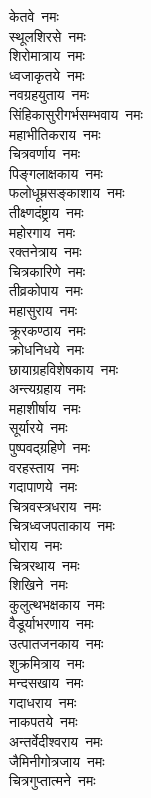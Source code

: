 \begin{flushleft}
\begin{multicols}{2}
केतवे~नमः\\
स्थूलशिरसे~नमः\\
शिरोमात्राय~नमः\\
ध्वजाकृतये~नमः\\
नवग्रहयुताय~नमः\\
सिंहिकासुरीगर्भसम्भवाय~नमः\\
महाभीतिकराय~नमः\\
चित्रवर्णाय~नमः\\
पिङ्गलाक्षकाय~नमः\\
फलोधूम्रसङ्काशाय~नमः\hfill{}\\
तीक्ष्णदंष्ट्राय~नमः\\
महोरगाय~नमः\\
रक्तनेत्राय~नमः\\
चित्रकारिणे~नमः\\
तीव्रकोपाय~नमः\\
महासुराय~नमः\\
क्रूरकण्ठाय~नमः\\
क्रोधनिधये~नमः\\
छायाग्रहविशेषकाय~नमः\\
अन्त्यग्रहाय~नमः\hfill{}\\
महाशीर्षाय~नमः\\
सूर्यारये~नमः\\
पुष्पवद्ग्रहिणे~नमः\\
वरहस्ताय~नमः\\
गदापाणये~नमः\\
चित्रवस्त्रधराय~नमः\\
चित्रध्वजपताकाय~नमः\\
घोराय~नमः\\
चित्ररथाय~नमः\\
शिखिने~नमः\hfill{}\\
कुलुत्थभक्षकाय~नमः\\
वैडूर्याभरणाय~नमः\\
उत्पातजनकाय~नमः\\
शुक्रमित्राय~नमः\\
मन्दसखाय~नमः\\
गदाधराय~नमः\\
नाकपतये~नमः\\
अन्तर्वेदीश्वराय~नमः\\
जैमिनीगोत्रजाय~नमः\\
चित्रगुप्तात्मने~नमः\hfill{}\\

\end{multicols}
\end{flushleft}
